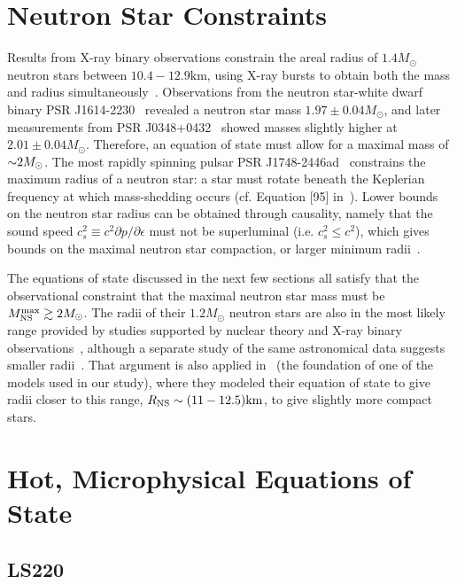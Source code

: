 \section{Neutron Star Constraints}
\label{sec:constraints}

Results from X-ray binary observations constrain the areal radius of $1.4M_\odot$ neutron stars between $10.4 - 12.9 \textrm{km}$, using X-ray bursts to obtain both the mass and radius simultaneously~\cite{van1979possible,ozel2006soft}.
Observations from the neutron star-white dwarf binary PSR J1614-2230~\cite{ozel2010massive} revealed a neutron star mass $1.97 \pm 0.04 M_\odot$, and later measurements from PSR J0348+0432~\cite{antoniadis2013massive} showed masses slightly higher at  $2.01 \pm 0.04 M_\odot$.  Therefore, an equation of state must allow for a maximal mass of $\mathord{\sim} 2 M_{\odot}$.
The most rapidly spinning pulsar PSR J1748-2446ad~\cite{hessels2006radio} constrains the maximum radius of a neutron star: a star must rotate beneath the Keplerian frequency at which mass-shedding occurs (cf. Equation [95] in~\cite{lattimer2016equation}).
Lower bounds on the neutron star radius can be obtained through causality, namely that the sound speed $c_s^2 \equiv c^2 \partial p / \partial \epsilon$ must not be superluminal (i.e. $c_s^2 \le c^2$), which gives bounds on the maximal neutron star compaction, or larger minimum radii~\cite{Haensel:1999}.

The equations of state discussed in the next few sections all satisfy that the observational constraint that the maximal neutron star mass must be $M_{\rm NS}^{\rm max} \gtrsim 2 M_\odot$.
The radii of their $1.2 M_\odot$ neutron stars are also in the most likely range provided by studies supported by nuclear theory and X-ray binary observations~\cite{Steiner2010,2013ApJ...765L...5S}, although a separate study of the same astronomical data suggests smaller radii~\cite{Guillot:2013wu}.  
That argument is also  applied in~\cite{steiner2013core} (the foundation of one of the models used in our study), where they modeled their equation of state to give radii closer to this range, $R_{\rm NS} \sim (11-12.5) {\rm km}$, to give slightly more compact stars.

\section{Hot, Microphysical Equations of State}
\label{sec:nuclear-eos}

\subsection{LS220}
\label{sec:ls220}

